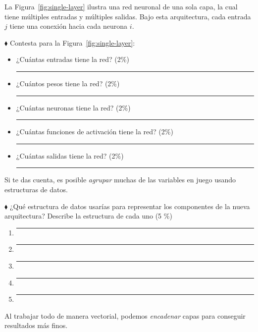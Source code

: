 \documentclass{article}
\newcommand{\responserule}{{\large\rule{14 cm}{0.3mm}}}
\newcommand{\veryshortresponserule}{{\large\rule{3 cm}{0.3mm}}}
\begin{document}
La Figura~\ref{fig:single-layer} ilustra una red neuronal de una sola capa, la cual tiene múltiples entradas y múltiples salidas.
Bajo esta arquitectura, cada entrada $j$ tiene una conexión hacia cada neurona $i$.

\vspace{2.5ex}

$\blacklozenge$ Contesta para la Figura~\ref{fig:single-layer}:

\begin{itemize}
    \item ¿Cuántas entradas tiene la red? (2\%) \hfill \veryshortresponserule
    \item ¿Cuántos pesos tiene la red? (2\%) \hfill \veryshortresponserule
    \item ¿Cuántas neuronas tiene la red? (2\%) \hfill \veryshortresponserule
    \item ¿Cuántas funciones de activación tiene la red? (2\%) \hfill \veryshortresponserule
    \item ¿Cuántas salidas tiene la red? (2\%) \hfill \veryshortresponserule
\end{itemize}

Si te das cuenta, es posible \textit{agrupar} muchas de las variables en juego usando estructuras de datos.

$\blacklozenge$ ¿Qué estructura de datos usarías para representar los componentes de la nueva arquitectura?
Describe la estructura de cada uno (5 \%)

\begin{enumerate}
    \itemsep2.5ex
    \item \responserule
    \item \responserule
    \item \responserule
    \item \responserule
    \item \responserule
\end{enumerate}

Al trabajar todo de manera vectorial, podemos \textit{encadenar} capas para conseguir resultados más finos.
\end{document}
